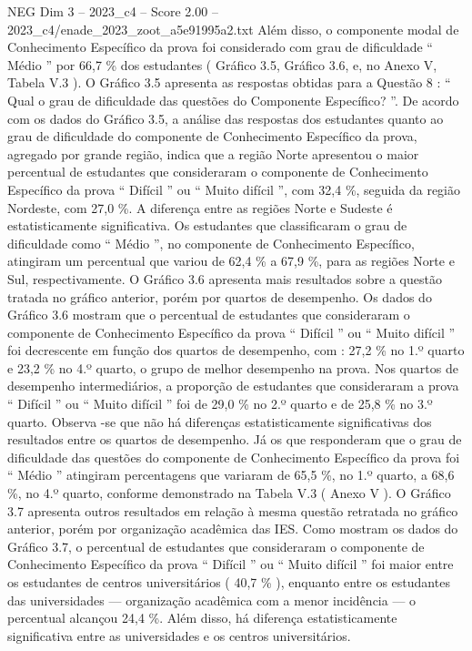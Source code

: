 \begin{textsample}{NEG Dim 3 – 2023\_c4 – Score 2.00 – 2023\_c4/enade\_2023\_zoot\_a5e91995a2.txt}
Além disso, o componente modal de Conhecimento Específico da prova foi considerado com grau de dificuldade “ Médio ” por 66,7 \% dos estudantes ( Gráfico 3.5, Gráfico 3.6, e, no Anexo V, Tabela V.3 ).
O Gráfico 3.5 apresenta as respostas obtidas para a Questão 8 : “ Qual o grau de dificuldade das questões do Componente Específico? ”.
De acordo com os dados do Gráfico 3.5, a análise das respostas dos estudantes quanto ao grau de dificuldade do componente de Conhecimento Específico da prova, agregado por grande região, indica que a região Norte apresentou o maior percentual de estudantes que consideraram o componente de Conhecimento Específico da prova “ Difícil ” ou “ Muito difícil ”, com 32,4 \%, seguida da região Nordeste, com 27,0 \%.
A diferença entre as regiões Norte e Sudeste é estatisticamente significativa.
Os estudantes que classificaram o grau de dificuldade como “ Médio ”, no componente de Conhecimento Específico, atingiram um percentual que variou de 62,4 \% a 67,9 \%, para as regiões Norte e Sul, respectivamente.
O Gráfico 3.6 apresenta mais resultados sobre a questão tratada no gráfico anterior, porém por quartos de desempenho.
Os dados do Gráfico 3.6 mostram que o percentual de estudantes que consideraram o componente de Conhecimento Específico da prova “ Difícil ” ou “ Muito difícil ” foi decrescente em função dos quartos de desempenho, com : 27,2 \% no 1.º quarto e 23,2 \% no 4.º quarto, o grupo de melhor desempenho na prova.
Nos quartos de desempenho intermediários, a proporção de estudantes que consideraram a prova “ Difícil ” ou “ Muito difícil ” foi de 29,0 \% no 2.º quarto e de 25,8 \% no 3.º quarto.
Observa -se que não há diferenças estatisticamente significativas dos resultados entre os quartos de desempenho.
Já os que responderam que o grau de dificuldade das questões do componente de Conhecimento Específico da prova foi “ Médio ” atingiram percentagens que variaram de 65,5 \%, no 1.º quarto, a 68,6 \%, no 4.º quarto, conforme demonstrado na Tabela V.3 ( Anexo V ).
O Gráfico 3.7 apresenta outros resultados em relação à mesma questão retratada no gráfico anterior, porém por organização acadêmica das IES.
Como mostram os dados do Gráfico 3.7, o percentual de estudantes que consideraram o componente de Conhecimento Específico da prova “ Difícil ” ou “ Muito difícil ” foi maior entre os estudantes de centros universitários ( 40,7 \% ), enquanto entre os estudantes das universidades — organização acadêmica com a menor incidência — o percentual alcançou 24,4 \%.
Além disso, há diferença estatisticamente significativa entre as universidades e os centros universitários.

\end{textsample}
